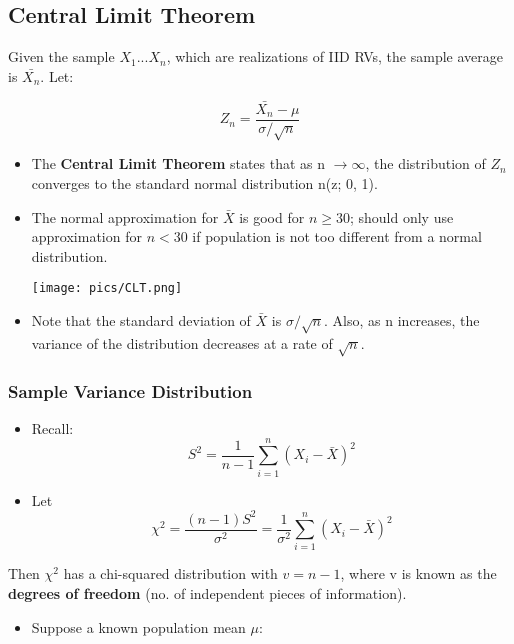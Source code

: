 \documentclass[10pt, letterpaper, twoside]{article}
\newenvironment{Figure}
  {\par\medskip\noindent\minipage{\linewidth}}
  {\endminipage\par\medskip}
\begin{document}
\begin{multicols}{2}
\subsection{Central Limit Theorem}

Given the sample $X_1 ... X_n$, which are realizations of IID RVs, the sample average is $\bar{X_n}$. Let:

\begin{equation*}
    Z_n = \frac{\bar{X_n} - \mu}{\sigma/\sqrt{n}}
\end{equation*}

\begin{itemize}
    \item The \textbf{Central Limit Theorem} states that as n $\rightarrow \infty$, the distribution of $Z_n$ converges to the standard normal distribution n(z; 0, 1).
    \item The normal approximation for $\bar{X}$ is good for $n \geq 30$; should only use approximation for $n < 30$ if population is not too different from a normal distribution.
    \begin{Figure}
        \centering
        \texttt{[image: pics/CLT.png]}
    \end{Figure}
    \item Note that the standard deviation of $\bar{X}$ is $\sigma/\sqrt{n}$. Also, as n increases, the variance of the distribution decreases at a rate of $\sqrt{n}$.
\end{itemize}
\subsubsection*{Sample Variance Distribution}
\begin{itemize}
    \item Recall: 
    \begin{equation*}
        S^2 = \frac{1}{n-1}\sum_{i=1}^n(X_i-\bar{X})^2
    \end{equation*}
    
    \item Let
    \begin{equation*}
        \chi^2 = \frac{(n-1)S^2}{\sigma^2} = \frac{1}{\sigma^2}\sum_{i=1}^n(X_i-\bar{X})^2
    \end{equation*}
    
\end{itemize}

Then $\chi^2$ has a chi-squared distribution with $v = n-1$, where v is known as the \textbf{degrees of freedom} (no. of independent pieces of information).
\begin{itemize}
    \item Suppose a known population mean $\mu$:


\end{itemize}
\end{multicols}
\end{document}
